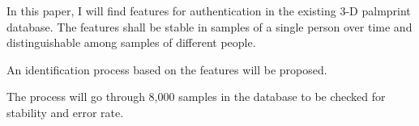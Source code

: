 In this paper, I will find features for authentication in the existing 3-D palmprint database. The features shall be stable in samples of a single person over time and distinguishable among samples of different people.

An identification process based on the features will be proposed.

The process will go through 8,000 samples in the database to be checked for stability and error rate.